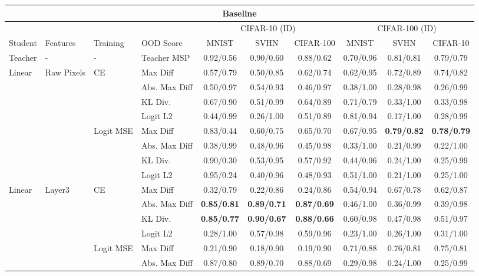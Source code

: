 \documentclass[border=2pt]{standalone}
\begin{document}
\setlength{\tabcolsep}{5pt}
\begin{tabular}{llllcccccc}
\multicolumn{10}{c}{\textbf{Baseline}}\\[4pt]
\toprule
 &  &  &  & \multicolumn{3}{c}{CIFAR-10 (ID)} & \multicolumn{3}{c}{CIFAR-100 (ID)} \\
\cmidrule(lr){5-7} \cmidrule(lr){8-10}
Student & Features & Training & OOD Score & MNIST & SVHN & CIFAR-100 & MNIST & SVHN & CIFAR-10 \\
\midrule
Teacher & - & - & Teacher MSP & 0.92/0.56 & 0.90/0.60 & 0.88/0.62 & 0.70/0.96 & 0.81/0.81 & 0.79/0.79 \\
\midrule
Linear & Raw Pixels & CE & Max Diff & 0.57/0.79 & 0.50/0.85 & 0.62/0.74 & 0.62/0.95 & 0.72/0.89 & 0.74/0.82 \\
 &  &  & Abs. Max Diff & 0.50/0.97 & 0.54/0.93 & 0.46/0.97 & 0.38/1.00 & 0.28/0.98 & 0.26/0.99 \\
 &  &  & KL Div. & 0.67/0.90 & 0.51/0.99 & 0.64/0.89 & 0.71/0.79 & 0.33/1.00 & 0.33/0.98 \\
 &  &  & Logit L2 & 0.44/0.99 & 0.26/1.00 & 0.51/0.89 & 0.81/0.94 & 0.17/1.00 & 0.28/0.99 \\
\addlinespace
 &  & Logit MSE & Max Diff & 0.83/0.44 & 0.60/0.75 & 0.65/0.70 & 0.67/0.95 & \textbf{0.79/0.82} & \textbf{0.78/0.79} \\
 &  &  & Abs. Max Diff & 0.38/0.99 & 0.48/0.96 & 0.45/0.98 & 0.33/1.00 & 0.21/0.99 & 0.22/1.00 \\
 &  &  & KL Div. & 0.90/0.30 & 0.53/0.95 & 0.57/0.92 & 0.44/0.96 & 0.24/1.00 & 0.25/0.99 \\
 &  &  & Logit L2 & 0.95/0.24 & 0.40/0.96 & 0.48/0.93 & 0.51/1.00 & 0.21/1.00 & 0.25/1.00 \\
\midrule
Linear & Layer3 & CE & Max Diff & 0.32/0.79 & 0.22/0.86 & 0.24/0.86 & 0.54/0.94 & 0.67/0.78 & 0.62/0.87 \\
 &  &  & Abs. Max Diff & \textbf{0.85/0.81} & \textbf{0.89/0.71} & \textbf{0.87/0.69} & 0.46/1.00 & 0.36/0.99 & 0.39/0.98 \\
 &  &  & KL Div. & \textbf{0.85/0.77} & \textbf{0.90/0.67} & \textbf{0.88/0.66} & 0.60/0.98 & 0.47/0.98 & 0.51/0.97 \\
 &  &  & Logit L2 & 0.28/1.00 & 0.57/0.98 & 0.59/0.96 & 0.23/1.00 & 0.26/1.00 & 0.31/1.00 \\
\addlinespace
 &  & Logit MSE & Max Diff & 0.21/0.90 & 0.18/0.90 & 0.19/0.90 & 0.71/0.88 & 0.76/0.81 & 0.75/0.81 \\
 &  &  & Abs. Max Diff & 0.87/0.80 & 0.89/0.70 & 0.88/0.69 & 0.29/0.98 & 0.24/1.00 & 0.25/0.99 \\

\end{tabular}
\end{document}
